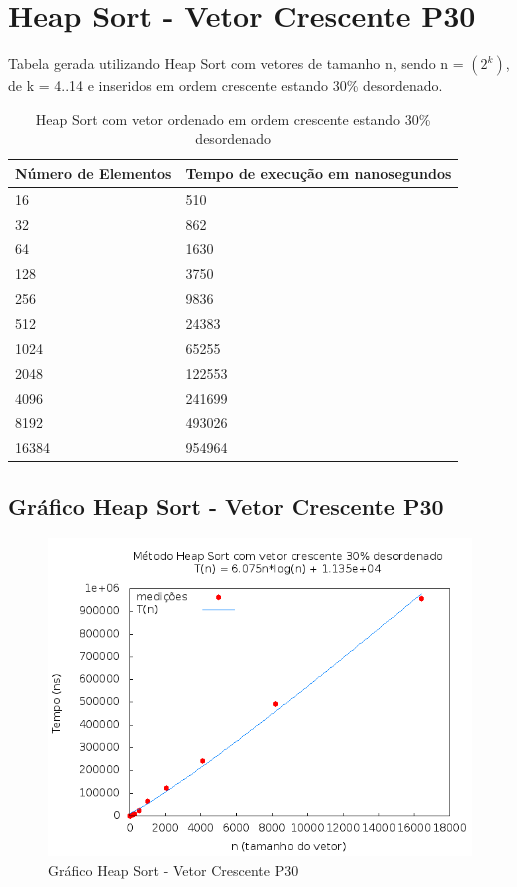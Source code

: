 \documentclass[12pt,a4paper,twoside]{report}
\begin{document}
\section{Heap Sort - Vetor Crescente P30}
Tabela gerada utilizando Heap Sort com vetores de tamanho n, sendo n = $(2^k)$, de k = 4..14 e inseridos em ordem crescente estando 30\% desordenado.
\begin{table}[H]
\centering
\caption{Heap Sort com vetor ordenado em ordem crescente estando 30\% desordenado}
\label{my-label}
\begin{tabular}{|l|l|}
\hline
\multicolumn{1}{|c|}{\textbf{Número de Elementos}} & \multicolumn{1}{c|}{\textbf{Tempo de execução em nanosegundos}} \\ \hline
16 & 510 \\ \hline
32 & 862 \\ \hline
64 & 1630 \\ \hline
128 & 3750 \\ \hline
256 & 9836 \\ \hline
512 & 24383 \\ \hline
1024 & 65255 \\ \hline
2048 & 122553 \\ \hline
4096 & 241699 \\ \hline
8192 & 493026 \\ \hline
16384 & 954964 \\ \hline
\end{tabular}
\end{table}

\subsection{Gráfico Heap Sort - Vetor Crescente P30}
\begin{figure}[H]
    \centering
    \includegraphics[width=0.7\linewidth]{graficos/HeapSort/vIntCrescenteP30/vIntCrescenteP30.png}
  \caption{Gráfico Heap Sort - Vetor Crescente P30}
\end{figure}
\end{document}
